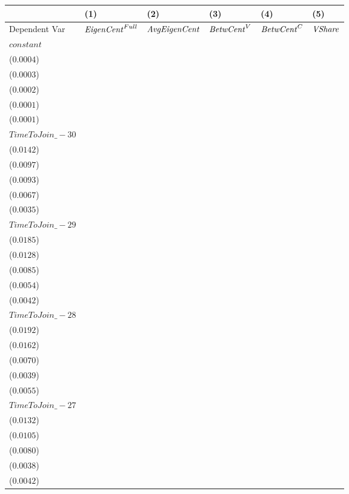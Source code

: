\begin{tabular}{llllll}
\toprule
{} &                                      (1) &                                      (2) &                                       (3) &                                       (4) &                                      (5) \\
\midrule
Dependent Var     &                 ${\it EigenCent}^{Full}$ &                     ${\it AvgEigenCent}$ &                        ${\it BetwCent}^V$ &                        ${\it BetwCent}^C$ &                           ${\it VShare}$ \\
$constant$        &  \makecell{$0.1347^{***}$ \\ ($0.0004$)} &  \makecell{$0.1357^{***}$ \\ ($0.0003$)} &   \makecell{$0.0465^{***}$ \\ ($0.0002$)} &   \makecell{$0.0536^{***}$ \\ ($0.0001$)} &  \makecell{$0.0599^{***}$ \\ ($0.0001$)} \\
$TimeToJoin\_-30$ &     \makecell{$0.0162^{}$ \\ ($0.0142$)} &     \makecell{$0.0106^{}$ \\ ($0.0097$)} &   \makecell{$-0.0198^{**}$ \\ ($0.0093$)} &    \makecell{$-0.0115^{*}$ \\ ($0.0067$)} &   \makecell{$0.0075^{**}$ \\ ($0.0035$)} \\
$TimeToJoin\_-29$ &     \makecell{$0.0184^{}$ \\ ($0.0185$)} &     \makecell{$0.0119^{}$ \\ ($0.0128$)} &   \makecell{$-0.0201^{**}$ \\ ($0.0085$)} &   \makecell{$-0.0118^{**}$ \\ ($0.0054$)} &    \makecell{$0.0076^{*}$ \\ ($0.0042$)} \\
$TimeToJoin\_-28$ &     \makecell{$0.0248^{}$ \\ ($0.0192$)} &     \makecell{$0.0211^{}$ \\ ($0.0162$)} &  \makecell{$-0.0207^{***}$ \\ ($0.0070$)} &  \makecell{$-0.0123^{***}$ \\ ($0.0039$)} &    \makecell{$0.0093^{*}$ \\ ($0.0055$)} \\
$TimeToJoin\_-27$ &     \makecell{$0.0109^{}$ \\ ($0.0132$)} &     \makecell{$0.0078^{}$ \\ ($0.0105$)} &   \makecell{$-0.0176^{**}$ \\ ($0.0080$)} &  \makecell{$-0.0098^{***}$ \\ ($0.0038$)} &     \makecell{$0.0060^{}$ \\ ($0.0042$)} \\

\end{tabular}
